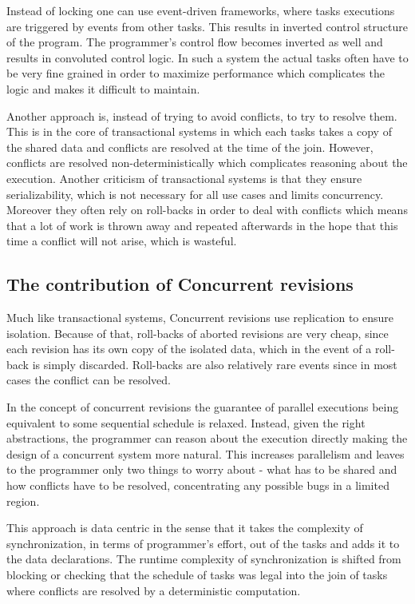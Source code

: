 \documentclass[12pt,twoside,notitlepage]{report}
\begin{document}
Instead of locking one can use event-driven frameworks, where tasks executions are triggered by events from other tasks.  This results in inverted control structure of the program. The programmer's control flow becomes inverted as well and results in convoluted control logic. In such a system the actual tasks often have to be very fine grained in order to maximize performance which complicates the logic and makes it difficult to maintain.

Another approach is, instead of trying to avoid conflicts, to try to resolve them. This is in the core of transactional systems in which each tasks takes a copy of the shared data and conflicts are resolved at the time of the join. However, conflicts are resolved non-deterministically which complicates reasoning about the execution. Another criticism of transactional systems is that they ensure serializability, which is not necessary for all use cases and limits concurrency\cite{database}. Moreover they often rely on roll-backs in order to deal with conflicts which means that a lot of work is thrown away and repeated afterwards in the hope that this time a conflict will not arise, which is wasteful.   



\subsection{The contribution of Concurrent revisions}

Much like transactional systems, Concurrent revisions use replication to ensure isolation. Because of that, roll-backs of aborted revisions are very cheap, since each revision has its own copy of the isolated data, which in the event of a roll-back is simply discarded. Roll-backs are also relatively rare events since in most cases the conflict can be resolved. 

In the concept of concurrent revisions the guarantee of parallel executions being equivalent to some sequential schedule is relaxed. Instead, given the right abstractions, the programmer can reason about the execution directly making the design of a concurrent system more natural. This increases parallelism and leaves to the programmer only two things to worry about - what has to be shared and how conflicts have to be resolved, concentrating any possible bugs in a limited region.

This approach is data centric in the sense that it takes the complexity of synchronization, in terms of programmer's effort, out of the tasks and adds it to the data declarations. The runtime complexity of synchronization is shifted from blocking or checking that the schedule of tasks was legal into the join of tasks where conflicts are resolved by a deterministic computation.   
\end{document}
